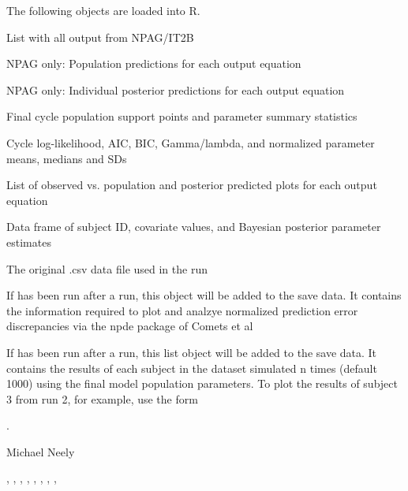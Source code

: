 \documentclass[a4paper]{book}
\begin{document}
\begin{Value}
The following objects are loaded into R.
\begin{ldescription}
\item[\code{NPdata/ITdata }] List with all output from NPAG/IT2B
\item[\code{pop }]  NPAG only: Population predictions for each output equation
\item[\code{post }]  NPAG only: Individual posterior predictions for each output equation
\item[\code{final }] Final cycle population support points and parameter summary statistics
\item[\code{cycle }] Cycle log-likelihood, AIC, BIC, Gamma/lambda, and normalized parameter means, medians and SDs
\item[\code{op }] List of observed vs. population and posterior predicted plots for each output equation
\item[\code{cov }] Data frame of subject ID, covariate values, and Bayesian posterior parameter estimates
\item[\code{mdata }] The original .csv data file used in the run
\item[\code{npde }] If  has been run after a run, this object will be added to 
the save data.  It contains the information required to plot and analzye normalized prediction
error discrepancies via the npde package of Comets et al
\item[\code{sim }] If  has been run after a run, this list object will be added to 
the save data.  It contains the results of each subject in the dataset simulated n times (default 1000)
using the final model population parameters.  To plot the results of subject 3 from run 2, for example, use the form
\end{ldescription}
.
\end{Value}
%
\begin{Author}\relax
Michael Neely
\end{Author}
%
\begin{SeeAlso}\relax
{}, , , 
, , , , 
, 
\end{SeeAlso}
\end{document}
